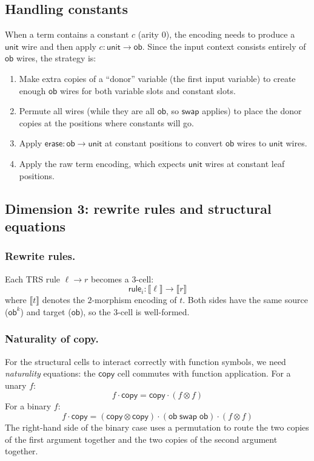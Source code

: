\documentclass[acmsmall,screen,nonacm]{acmart}
\newcommand{\ob}{\mathsf{ob}}
\newcommand{\unit}{\mathsf{unit}}
\newcommand{\copy}{\mathsf{copy}}
\newcommand{\swap}{\mathsf{swap}}
\newcommand{\erase}{\mathsf{erase}}
\begin{document}
\subsection{Handling constants}
\label{sec:constants}

When a term contains a constant $c$ (arity $0$), the encoding needs to
produce a $\unit$ wire and then apply $c : \unit \to \ob$.  Since the
input context consists entirely of $\ob$ wires, the strategy is:
\begin{enumerate}
\item Make extra copies of a ``donor'' variable (the first input
  variable) to create enough $\ob$ wires for both variable slots and
  constant slots.
\item Permute all wires (while they are all $\ob$, so $\swap$ applies)
  to place the donor copies at the positions where constants will go.
\item Apply $\erase : \ob \to \unit$ at constant positions to convert
  $\ob$ wires to $\unit$ wires.
\item Apply the raw term encoding, which expects $\unit$ wires at
  constant leaf positions.
\end{enumerate}

\subsection{Dimension 3: rewrite rules and structural equations}
\label{sec:dim3}

\subsubsection{Rewrite rules.}
Each TRS rule $\ell \to r$ becomes a $3$-cell:
\[
  \mathsf{rule}_i : \llbracket \ell \rrbracket \to \llbracket r \rrbracket
\]
where $\llbracket t \rrbracket$ denotes the $2$-morphism encoding of
$t$.  Both sides have the same source ($\ob^k$) and target ($\ob$),
so the $3$-cell is well-formed.

\subsubsection{Naturality of copy.}
For the structural cells to interact correctly with function symbols, we
need \emph{naturality} equations: the $\copy$ cell commutes with
function application.  For a unary $f$:
\[
  f \cdot \copy = \copy \cdot (f \otimes f)
\]
For a binary $f$:
\[
  f \cdot \copy = (\copy \otimes \copy) \cdot
  (\ob\;\swap\;\ob) \cdot (f \otimes f)
\]
The right-hand side of the binary case uses a permutation to route the
two copies of the first argument together and the two copies of the
second argument together.
\end{document}
